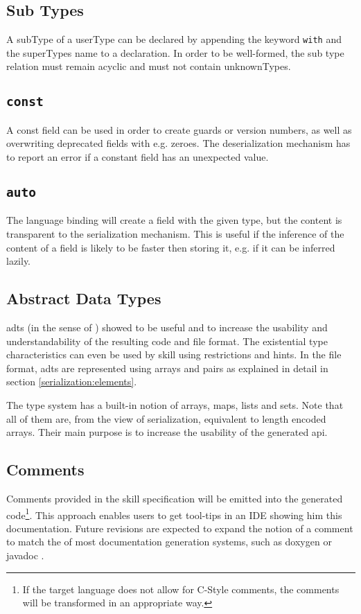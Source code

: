 \subsection{Sub Types}
A \gls{subType} of a \gls{userType} can be declared by appending the keyword \texttt{with} and the \gls{superType}s name to a declaration. In order to be well-formed, the sub type relation must remain acyclic and must not contain \glspl{unknownType}.

\subsection{\texttt{const}}
A const field can be used in order to create guards or version numbers, as well as overwriting deprecated fields with e.g. zeroes. The deserialization mechanism has to report an error if a constant field has an unexpected value.

\subsection{\texttt{auto}}
The language binding will create a field with the given type, but the content is transparent to the serialization mechanism. This is useful if the inference of the content of a field is likely to be faster then storing it, e.g. if it can be inferred lazily.


\subsection{Abstract Data Types}

\glspl{adt} (in the sense of \cite{adts}) showed to be useful and to increase the usability and understandability of the resulting code and file format. The existential type characteristics can even be used by \gls{skill} using restrictions and hints. In the file format, \glspl{adt} are represented using arrays and pairs as explained in detail in section \ref{serialization:elements}.

The type system has a built-in notion of arrays, maps, lists and sets. Note that all of them are, from the view of serialization, equivalent to length encoded arrays. Their main purpose is to increase the usability of the generated \gls{api}.


\subsection{Comments}
Comments provided in the \gls{skill} specification will be emitted into the generated code\footnote{If the target language does not allow for C-Style comments, the comments will be transformed in an appropriate way.}. This approach enables users to get tool-tips in an IDE showing him this documentation. Future revisions are expected to expand the notion of a comment to match the of most documentation generation systems, such as doxygen \cite{doxygen} or javadoc \cite{javadoc}.



